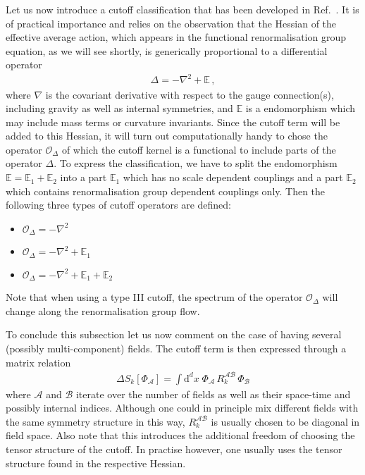 \documentclass[11pt]{book}
\numberwithin{equation}{chapter}
\begin{document}
\noindent
Let us now introduce a cutoff classification that has been
developed in Ref.~\cite{Codello:2008vh}. It is of practical
importance and relies on the observation that the Hessian
of the effective average action, which appears in the
functional renormalisation group equation, as we will see
shortly, is generically proportional to a differential
operator
\begin{align}
  \Delta = - \nabla^2 + \mathbb E \,,
\end{align}
where $\nabla$ is the covariant derivative with respect to
the gauge connection(s), including gravity as well as internal
symmetries, and $\mathbb E$ is a endomorphism which may include
mass terms or curvature invariants. Since the cutoff term will
be added to this Hessian, it will turn out computationally
handy to chose the operator $\mathcal O_\Delta$ of which the cutoff
kernel is a functional to include parts of the operator $\Delta$.
To express the classification, we have to split
the endomorphism $\mathbb E = \mathbb E_1 + \mathbb E_2$
into a part $\mathbb E_1$ which has no scale dependent
couplings and a part $\mathbb E_2$ which contains
renormalisation group dependent couplings only.
Then the following three types of cutoff operators
are defined:
\bigskip
\begin{itemize}
  \setlength\itemsep{2.0mm}
  \item
    {   {$\mathcal O_\Delta = - \nabla^2$}}
  \item
    {  {$\mathcal O_\Delta = - \nabla^2 + \mathbb E_1$}}
  \item
    { {$\mathcal O_\Delta = - \nabla^2 + \mathbb E_1 + \mathbb E_2$}}
\end{itemize}
\bigskip
Note that when using a type III cutoff, the spectrum of the operator
$\mathcal O_\Delta$ will change along the renormalisation group
flow.

To conclude this subsection let us now comment on the case
of having several (possibly multi-component) fields.
The cutoff term is then expressed through a matrix relation
\begin{align}
  \Delta S_k [ \Phi_{\mathcal A} ]
  = \int \mathrm d^dx \;
  \Phi_{\mathcal A} \, R^{\mathcal A \mathcal B}_k \, \Phi_{\mathcal B}
\end{align}
where $\mathcal A$ and $\mathcal B$ iterate over the number
of fields as well as their space-time and possibly internal
indices. Although one could in principle mix different fields
with the same symmetry structure in this way,
$R^{\mathcal A \mathcal B}_k$ is usually chosen to be diagonal
in field space. Also note that this introduces the additional
freedom of choosing the tensor structure of the cutoff.
In practise however, one usually uses the tensor structure
found in the respective Hessian.
\end{document}
